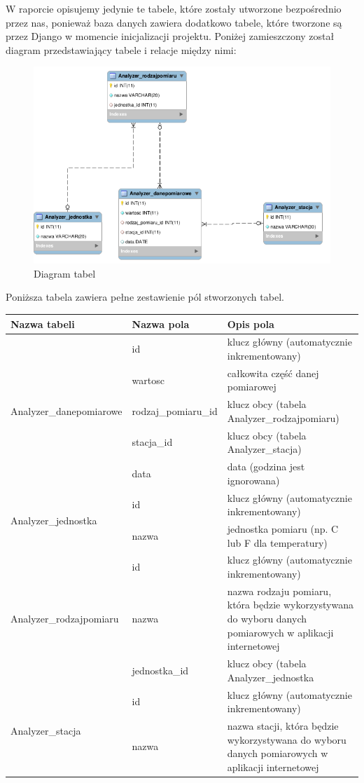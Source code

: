 W raporcie opisujemy jedynie te tabele, które zostały utworzone bezpośrednio przez nas, ponieważ baza danych zawiera dodatkowo tabele, które tworzone są przez Django w momencie inicjalizacji projektu.
Poniżej zamieszczony został diagram przedstawiający tabele i relacje między nimi:
\begin{figure}[H]
\centering
\includegraphics[width=\linewidth]{diagramEER}
\caption{Diagram tabel}
\label{fig:diagramTabel}
\end{figure}

 Poniższa tabela zawiera pełne zestawienie pól stworzonych tabel.
\begin{longtable}{|p{0.25\linewidth}|p{0.25\linewidth}||p{0.5\linewidth}|}
\hline
\textbf{Nazwa tabeli} & \textbf{Nazwa pola} & \textbf{Opis pola} \tabularnewline \hline \hline
\multirow{5}{*}{Analyzer\_danepomiarowe} & id & klucz główny (automatycznie inkrementowany) \tabularnewline\cline{2-3}
 & wartosc & całkowita część danej pomiarowej \tabularnewline\cline{2-3}
 & rodzaj\_pomiaru\_id & klucz obcy (tabela Analyzer\_rodzajpomiaru) \tabularnewline\cline{2-3}
 & stacja\_id & klucz obcy (tabela Analyzer\_stacja)\tabularnewline\cline{2-3}
 & data & data (godzina jest ignorowana) \tabularnewline\hline
\multirow{2}{*}{Analyzer\_jednostka} 
 & id & klucz główny (automatycznie inkrementowany) \tabularnewline\cline{2-3}
 & nazwa & jednostka pomiaru (np. C lub F dla temperatury) \tabularnewline\hline
\multirow{3}{*}{Analyzer\_rodzajpomiaru}
 & id & klucz główny (automatycznie inkrementowany) \tabularnewline\cline{2-3}
 & nazwa & nazwa rodzaju pomiaru, która będzie wykorzystywana do wyboru danych pomiarowych w aplikacji internetowej \tabularnewline\cline{2-3}
 & jednostka\_id & klucz obcy (tabela Analyzer\_jednostka \tabularnewline\hline
\multirow{2}{*}{Analyzer\_stacja}
 & id & klucz główny (automatycznie inkrementowany) \tabularnewline\cline{2-3}
 & nazwa & nazwa stacji, która będzie wykorzystywana do wyboru danych pomiarowych w aplikacji internetowej \tabularnewline\hline
\end{longtable}

